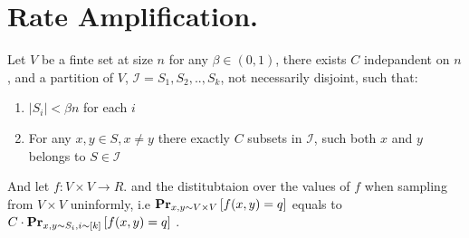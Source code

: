 \documentclass[manuscript,screen,review]{acmart}
\begin{document}
\section{Rate Amplification.}


\begin{claim}
  Let $V$ be a finte set at size $n$ for any $\beta \in (0,1)$, there exists $C$ indepandent on $n$, and a partition of $V$, $\mathcal{I} = S_{1},S_{2},..,S_{k}$, not necessarily disjoint, such that: 
  \begin{enumerate}
    \item $|S_{i}| < \beta n$ for each $i$
    \item For any $x,y \in S, x\neq y$ there exactly $C$ subsets in $\mathcal{I}$, such both $x$ and $y$ belongs to $S \in \mathcal{I}$
  \end{enumerate}
\end{claim}
\begin{corollary}
And let $ f : V \times V \rightarrow R$. and the distitubtaion over the values of $f$ when sampling from $V \times V$ uninformly, i.e $\prbm{ f(x,y) = q  }{x,y \sim V \times V}$  equals to $C \cdot \prbm{f(x,y) = q }{x,y \sim S_{i}, i\sim [k]}$ .
\end{corollary}

%
%
%
\end{document}
